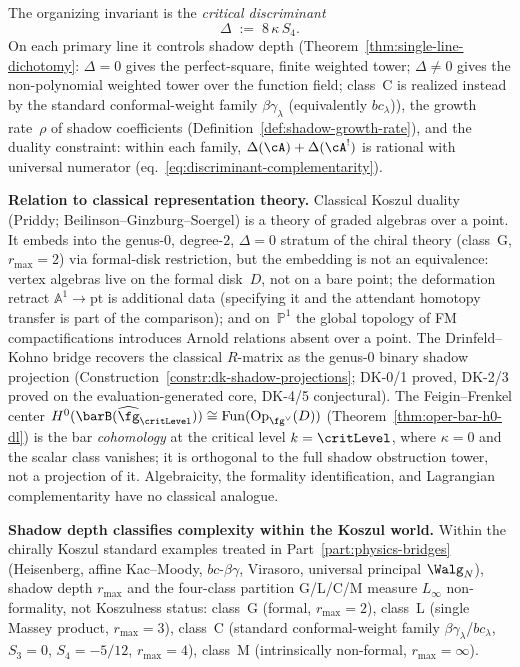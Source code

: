 \noindent
The organizing invariant is the \emph{critical discriminant}
\begin{equation}\label{eq:concordance-discriminant}
 \Delta \;:=\; 8\,\kappa\,S_4.
\end{equation}
On each primary line it controls shadow depth
(Theorem~\ref{thm:single-line-dichotomy}:
$\Delta = 0$ gives the perfect-square, finite weighted tower;
$\Delta \neq 0$ gives the non-polynomial weighted tower over the
function field;
class~C is realized instead by the standard conformal-weight family
$\beta\gamma_\lambda$ \textup{(}equivalently $bc_\lambda$\textup{)}),
the growth rate~$\rho$ of shadow coefficients
(Definition~\ref{def:shadow-growth-rate}),
and the duality constraint:
within each family, $\Delta(\cA) + \Delta(\cA^!)$
is rational with universal numerator
(eq.~\eqref{eq:discriminant-complementarity}).

\medskip\noindent
\textbf{Relation to classical representation theory.}\enspace
Classical Koszul duality (Priddy; Beilinson--Ginzburg--Soergel)
is a theory of graded algebras over a point.
It embeds into the genus-$0$, degree-$2$, $\Delta = 0$ stratum
of the chiral theory (class~G, $r_{\max} = 2$) via
formal-disk restriction, but the embedding is not an
equivalence: vertex algebras live on the formal disk~$D$,
not on a bare point; the deformation retract
$\mathbb{A}^1 \to \mathrm{pt}$ is additional data
(specifying it and the attendant homotopy transfer is part
of the comparison); and
on~$\mathbb{P}^1$ the global topology of FM
compactifications introduces Arnold relations absent over
a point.
The Drinfeld--Kohno bridge recovers the classical $R$-matrix
as the genus-$0$ binary shadow projection
(Construction~\ref{constr:dk-shadow-projections};
DK-0/1 proved, DK-2/3 proved on the evaluation-generated core,
DK-4/5 conjectural).
The Feigin--Frenkel center
$H^0(\barB(\widehat{\fg}_{\critLevel})) \cong
\operatorname{Fun}(\operatorname{Op}_{\fg^\vee}(D))$
(Theorem~\ref{thm:oper-bar-h0-dl}) is the bar \emph{cohomology}
at the critical level $k = \critLevel$, where $\kappa = 0$
and the scalar class vanishes; it is orthogonal to the
full shadow obstruction tower, not a projection of it.
Algebraicity, the formality identification,
and Lagrangian complementarity have no classical analogue.

\medskip\noindent
\textbf{Shadow depth classifies complexity within the Koszul world.}\enspace
Within the chirally Koszul standard examples treated in
Part~\ref{part:physics-bridges} (Heisenberg, affine Kac--Moody,
$bc$-$\beta\gamma$, Virasoro, universal principal $\Walg_N$),
shadow depth $r_{\max}$ and the four-class partition
G/L/C/M measure $L_\infty$ non-formality, not
Koszulness status:
class~G (formal, $r_{\max} = 2$),
class~L (single Massey product, $r_{\max} = 3$),
class~C \textup{(}standard conformal-weight family
$\beta\gamma_\lambda$/$bc_\lambda$, $S_3 = 0$, $S_4 = -5/12$,
$r_{\max} = 4$\textup{)},
class~M (intrinsically non-formal, $r_{\max} = \infty$).

